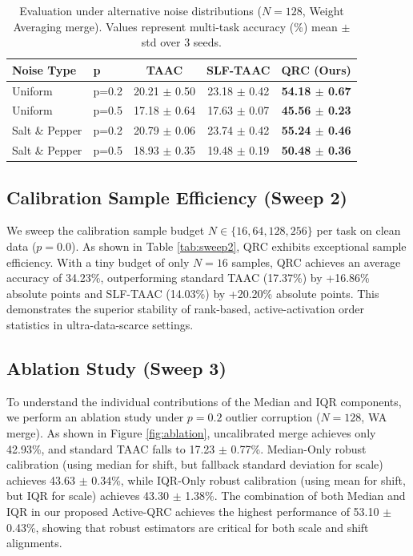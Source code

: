 \documentclass{article}
\theoremstyle{plain}
\theoremstyle{definition}
\theoremstyle{remark}
\begin{document}
\begin{table}[t]
  \caption{Evaluation under alternative noise distributions ($N=128$, Weight Averaging merge). Values represent multi-task accuracy (\%) mean $\pm$ std over 3 seeds.}
  \label{tab:alt_noise}
  \vskip 0.1in
  \begin{center}
    \begin{small}
      \begin{tabular}{llccc}
        \toprule
        \textbf{Noise Type} & \textbf{p} & \textbf{TAAC} & \textbf{SLF-TAAC} & \textbf{QRC (Ours)} \\
        \midrule
        Uniform       & p=0.2 & 20.21 $\pm$ 0.50 & 23.18 $\pm$ 0.42 & \textbf{54.18 $\pm$ 0.67} \\
        Uniform       & p=0.5 & 17.18 $\pm$ 0.64 & 17.63 $\pm$ 0.07 & \textbf{45.56 $\pm$ 0.23} \\
        \midrule
        Salt \& Pepper & p=0.2 & 20.79 $\pm$ 0.06 & 23.74 $\pm$ 0.42 & \textbf{55.24 $\pm$ 0.46} \\
        Salt \& Pepper & p=0.5 & 18.93 $\pm$ 0.35 & 19.48 $\pm$ 0.19 & \textbf{50.48 $\pm$ 0.36} \\
        \bottomrule
      \end{tabular}
    \end{small}
  \end{center}
  \vskip -0.1in
\end{table}

\subsection{Calibration Sample Efficiency (Sweep 2)}
We sweep the calibration sample budget $N \in \{16, 64, 128, 256\}$ per task on clean data ($p=0.0$). As shown in Table \ref{tab:sweep2}, QRC exhibits exceptional sample efficiency. With a tiny budget of only $N=16$ samples, QRC achieves an average accuracy of 34.23\%, outperforming standard TAAC (17.37\%) by +16.86\% absolute points and SLF-TAAC (14.03\%) by +20.20\% absolute points. This demonstrates the superior stability of rank-based, active-activation order statistics in ultra-data-scarce settings.

\subsection{Ablation Study (Sweep 3)}
To understand the individual contributions of the Median and IQR components, we perform an ablation study under $p=0.2$ outlier corruption ($N=128$, WA merge).
As shown in Figure \ref{fig:ablation}, uncalibrated merge achieves only 42.93\%, and standard TAAC falls to 17.23 $\pm$ 0.77\%. Median-Only robust calibration (using median for shift, but fallback standard deviation for scale) achieves 43.63 $\pm$ 0.34\%, while IQR-Only robust calibration (using mean for shift, but IQR for scale) achieves 43.30 $\pm$ 1.38\%. The combination of both Median and IQR in our proposed Active-QRC achieves the highest performance of 53.10 $\pm$ 0.43\%, showing that robust estimators are critical for both scale and shift alignments.
\end{document}

